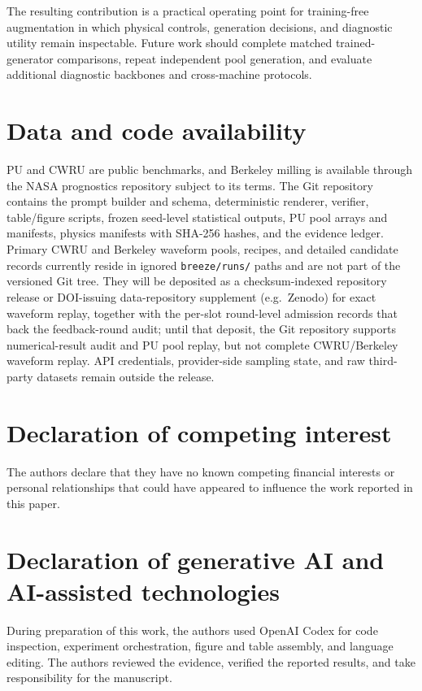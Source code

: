 \documentclass[a4paper,fleqn]{cas-sc}
\begin{document}
The resulting contribution is a practical operating point for training-free
augmentation in which physical controls, generation decisions, and diagnostic
utility remain inspectable. Future work should complete matched trained-
generator comparisons, repeat independent pool generation, and evaluate
additional diagnostic backbones and cross-machine protocols.

\section*{Data and code availability}

PU and CWRU are public benchmarks, and Berkeley milling is available through
the NASA prognostics repository subject to its terms. The Git repository
contains the prompt builder and schema, deterministic renderer, verifier,
table/figure scripts, frozen seed-level statistical outputs, PU pool arrays and
manifests, physics manifests with SHA-256 hashes, and the evidence ledger.
Primary CWRU and Berkeley waveform pools, recipes, and detailed candidate
records currently reside in ignored \texttt{breeze/runs/} paths and are not
part of the versioned Git tree. They will be deposited as a checksum-indexed
repository release or DOI-issuing data-repository supplement (e.g.\ Zenodo)
for exact waveform replay, together with the per-slot round-level admission
records that back the feedback-round audit;
until that deposit, the Git repository supports numerical-result audit and PU
pool replay, but not complete CWRU/Berkeley waveform replay. API credentials,
provider-side sampling state, and raw third-party datasets remain outside the
release.

\section*{Declaration of competing interest}

The authors declare that they have no known competing financial interests or
personal relationships that could have appeared to influence the work
reported in this paper.

\section*{Declaration of generative AI and AI-assisted technologies}

During preparation of this work, the authors used OpenAI Codex for code
inspection, experiment orchestration, figure and table assembly, and language
editing. The authors reviewed the evidence, verified the reported results, and
take responsibility for the manuscript.



\end{document}
